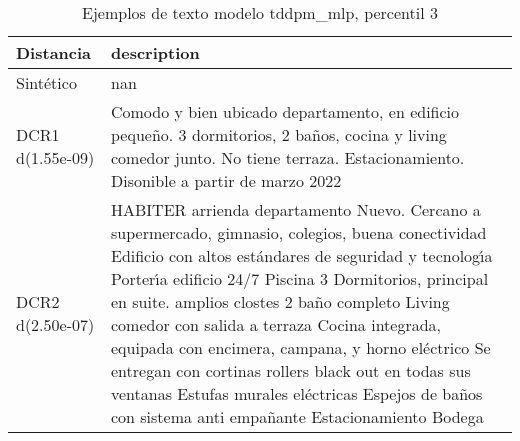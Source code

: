 \begin{table}[H]
\centering
\fontsize{10}{14}\selectfont
\caption{Ejemplos de texto modelo tddpm\_mlp, percentil 3}
\label{table-example-economicos-a-2-tddpm_mlp-3p-text}
\begin{tabular}{|l|m{35em}|}
\hline
\rowcolor[gray]{0.8}
Distancia & description \\
\hline Sintético & nan \\
\hline DCR1 d(1.55e-09) & Comodo y bien ubicado departamento, en edificio peque\~no. 3 dormitorios, 2 ba\~nos, cocina y living comedor junto. No tiene terraza. Estacionamiento. Disonible a partir de marzo 2022 \\
\hline DCR2 d(2.50e-07) & HABITER arrienda departamento Nuevo.  Cercano a supermercado, gimnasio, colegios, buena conectividad  Edificio con altos est\'andares de seguridad y tecnolog{\'\i}a Porter{\'\i}a edificio 24/7 Piscina  3 Dormitorios, principal en suite. amplios clostes 2 ba\~no completo Living comedor con salida a terraza Cocina integrada, equipada con encimera, campana, y horno el\'ectrico   Se entregan con cortinas rollers black out en todas sus ventanas Estufas murales el\'ectricas Espejos de ba\~nos con sistema anti empa\~nante Estacionamiento  Bodega \\
\hline
\end{tabular}
\end{table}
